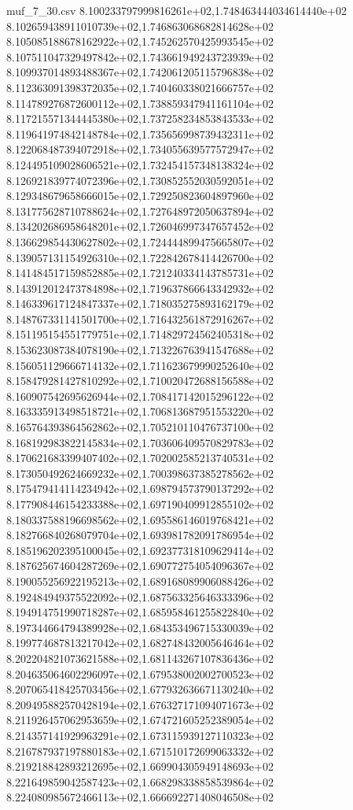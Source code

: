 \begin{filecontents*}{muf_7_30.csv}
8.100233797999816261e+02,1.748463444034614440e+02
8.102659438911010739e+02,1.746863068682814628e+02
8.105085188678162922e+02,1.745262570425993545e+02
8.107511047329497842e+02,1.743661949243723939e+02
8.109937014893488367e+02,1.742061205115796838e+02
8.112363091398372035e+02,1.740460338021666757e+02
8.114789276872600112e+02,1.738859347941161104e+02
8.117215571344445380e+02,1.737258234853843533e+02
8.119641974842148784e+02,1.735656998739432311e+02
8.122068487394072918e+02,1.734055639577572947e+02
8.124495109028606521e+02,1.732454157348138324e+02
8.126921839774072396e+02,1.730852552030592051e+02
8.129348679658666015e+02,1.729250823604897960e+02
8.131775628710788624e+02,1.727648972050637894e+02
8.134202686958648201e+02,1.726046997347657452e+02
8.136629854430627802e+02,1.724444899475665807e+02
8.139057131154926310e+02,1.722842678414426700e+02
8.141484517159852885e+02,1.721240334143785731e+02
8.143912012473784898e+02,1.719637866643342932e+02
8.146339617124847337e+02,1.718035275893162179e+02
8.148767331141501700e+02,1.716432561872916267e+02
8.151195154551779751e+02,1.714829724562405318e+02
8.153623087384078190e+02,1.713226763941547688e+02
8.156051129666714132e+02,1.711623679990252640e+02
8.158479281427810292e+02,1.710020472688156588e+02
8.160907542695626944e+02,1.708417142015296122e+02
8.163335913498518721e+02,1.706813687951553220e+02
8.165764393864562862e+02,1.705210110476737100e+02
8.168192983822145834e+02,1.703606409570829783e+02
8.170621683399407402e+02,1.702002585213740531e+02
8.173050492624669232e+02,1.700398637385278562e+02
8.175479414114234942e+02,1.698794573790137292e+02
8.177908446154233388e+02,1.697190409912855102e+02
8.180337588196698562e+02,1.695586146019768421e+02
8.182766840268079704e+02,1.693981782091786954e+02
8.185196202395100045e+02,1.692377318109629414e+02
8.187625674604287269e+02,1.690772754054096367e+02
8.190055256922195213e+02,1.689168089906088426e+02
8.192484949375522092e+02,1.687563325646333396e+02
8.194914751990718287e+02,1.685958461255822840e+02
8.197344664794389928e+02,1.684353496715330039e+02
8.199774687813217042e+02,1.682748432005646464e+02
8.202204821073621588e+02,1.681143267107836436e+02
8.204635064602296097e+02,1.679538002002700523e+02
8.207065418425703456e+02,1.677932636671130240e+02
8.209495882570428194e+02,1.676327171094071673e+02
8.211926457062953659e+02,1.674721605252389054e+02
8.214357141929963291e+02,1.673115939127110323e+02
8.216787937197880183e+02,1.671510172699063332e+02
8.219218842893212695e+02,1.669904305949148693e+02
8.221649859042587423e+02,1.668298338858539864e+02
8.224080985672466113e+02,1.666692271408046508e+02

\end{filecontents*}
